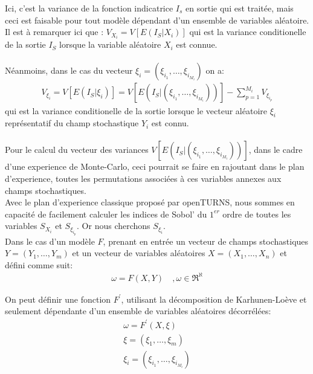 \documentclass[a4paper,10pt]{article}
\begin{document}
Ici, c'est la variance de la fonction indicatrice $I_{s}$ en sortie qui est traitée, mais ceci est faisable pour tout modèle dépendant d'un ensemble de variables aléatoire. Il est à remarquer ici que : 
$V_{X_{i}} = V\left[E\left(I_{S}|X_{i}\right)\right]$ qui est la variance conditionelle de la sortie $I_{S}$ lorsque la variable aléatoire $X_{i}$ est connue. \\ 
\\
Néanmoins, dans le cas du vecteur $\xi_{i} = (\xi_{i_{1}},\ldots,\xi_{i_{M_{i}}})$ on a: \\
\begin{eqnarray}
V_{\xi_{i}} = V\left[E\left(I_{S}|\xi_{i}\right)\right] = V\left[E\left(I_{S}|(\xi_{i_{1}},\ldots,\xi_{i_{M_{i}}})\right)\right] - \sum_{p=1}^{M_{i}}V_{\xi_{i_{p}}}
\end{eqnarray}
qui est la variance conditionelle de la sortie lorsque le vecteur aléatoire $\xi_{i}$ représentatif du champ stochastique $Y_{i}$ est connu.\\
\\  
Pour le calcul du vecteur des variances $V\left[E\left(I_{S}|(\xi_{i_{1}},\ldots,\xi_{i_{M_{i}}})\right)\right]$, dans le cadre d'une experience de Monte-Carlo, ceci pourrait se faire en rajoutant dans le plan d'experience, toutes les permutations associées à ces variables annexes aux champs stochastiques. \\

Avec le plan d'experience classique proposé par openTURNS, nous sommes en capacité de facilement calculer les indices de Sobol' du $1^{er}$ ordre de toutes les variables $S_{X_{i}}$ et $S_{\xi_{i_{p}}}$. Or nous cherchons $S_{\xi_{i}}$.\\
Dans le cas d'un modèle $F$, prenant en entrée un vecteur de champs stochastiques $Y = (Y_{1},\ldots,Y_{m})$ et un vecteur de variables aléatoires $X = (X_{1},\ldots,X_{n})$ et défini comme suit:  
\begin{align}
\omega = F(X,Y) &\  ,\omega \in \Re^{\aleph}
\end{align}


On peut définir une fonction $F^{'}$, utilisant la décomposition de Karhunen-Loève et seulement dépendante d'un ensemble de variables aléatoires décorrélées: 
\begin{align}
\omega = F^{'}(X,\xi) \\
\xi = (\xi_{1},\ldots,\xi_{m})\\
\xi_{i} = (\xi_{i_{1}},\ldots,\xi_{i_{M_{i}}})
\end{align} \\
\end{document}
